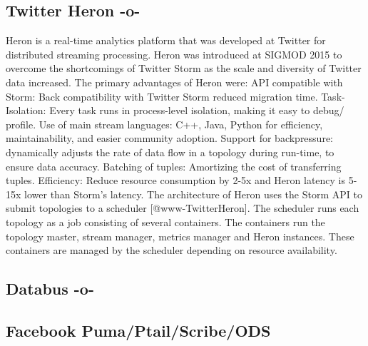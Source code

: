 \subsection{Twitter Heron -o-}

Heron is a real-time analytics platform that was developed at Twitter
for distributed streaming processing. Heron was introduced at SIGMOD
2015 to overcome the shortcomings of Twitter Storm as the scale and
diversity of Twitter data increased.  The primary advantages of Heron
were: API compatible with Storm: Back compatibility with Twitter Storm
reduced migration time\cite{www-TwitterHeronOpen}.  Task-Isolation:
Every task runs in process-level isolation, making it easy to debug/
profile. Use of main stream languages: C++, Java, Python for
efficiency, maintainability, and easier community adoption. Support
for backpressure: dynamically adjusts the rate of data flow in a
topology during run-time, to ensure data accuracy. Batching of tuples:
Amortizing the cost of transferring tuples. Efficiency: Reduce
resource consumption by 2-5x and Heron latency is 5-15x lower than
Storm's latency. The architecture of Heron uses the Storm API to
submit topologies to a scheduler [@www-TwitterHeron].  The
scheduler runs each topology as a job consisting of several
containers. The containers run the topology master, stream manager,
metrics manager and Heron instances. These containers are managed by
the scheduler depending on resource availability.



\subsection{Databus -o-}



\subsection{Facebook Puma/Ptail/Scribe/ODS}
     
